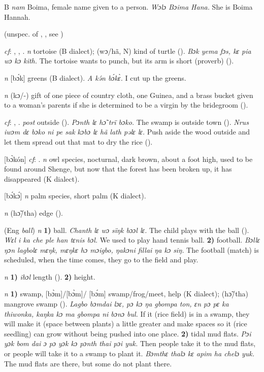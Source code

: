 \begin{letter}{B}
 \textit{nam} Boima, female name given to a person. \textit{Wɔlɔ Bɔima Hana.} She is Boima Hannah.

 (unspec. of , , see ) 

 \textit{cf}: , , . \textit{n} tortoise (B dialect); (wɔ/hã, N) kind of turtle (\citealt{Pichl1967}). \textit{Bɔk yema fɔs, kɛ pia wɔ kɔ kith.} The tortoise wants to punch, but its arm is short (proverb) (\citealt{TISLL1979}).

 \textit{n} [bɔ́k] greens (B dialect). \textit{A kə́n bɔ́kɛ̀.} I cut up the greens.

 \textit{n} (kɔ/-) gift of one piece of country cloth, one Guinea, and a brass bucket given to a woman's parents if she is determined to be a virgin by the bridegroom (\citealt{Pichl1967}). 

 \textit{cf}: , . \textit{post} outside (\citealt{Pichl1967}). \textit{Pɔnth lɛ hɔ̃ trï bɔko.} The swamp is outside town (\citealt{Pichl1967}). \textit{Nrus iwɔm dɛ bɔko ni pe sak kɔbɔ lɛ hã lath pəlɛ lɛ.} Push aside the wood outside and let them spread out that mat to dry the rice (\citealt{Pichl1967}). 

 [bɔ̀kón] \textit{cf}: . \textit{n} owl species, nocturnal, dark brown, about a foot high, used to be found around Shenge, but now that the forest has been broken up, it has disappeared (K dialect). 

 [bɔ́kɔ́] \textit{n} palm species, short palm (K dialect). 

 \textit{n} (hɔ̃/tha) edge (\citealt{Pichl1967}).

 (Eng \textit{ball}) \textit{n} \textbf{1)} ball. \textit{Chanth lɛ wɔ sïŋk bɔɔl lɛ.} The child plays with the ball (\citealt{Pichl1967}). \textit{Wɛl i ka che ple han tɛnis bɔl.} We used to play hand tennis ball. \textbf{2)} football. \textit{Bɔllɛ ŋɔn lagbolɛ mɛŋk, mɛŋkɛ hɔ mɔigbo, ŋakɔni fillai ŋa kɔ siŋ.} The football (match) is scheduled, when the time comes, they go to the field and play.

 \textit{n} \textbf{1)} \textit{ibɔl} length (\citealt{Sumner1921}). \textbf{2)} height.

 \textit{n} \textbf{1)} swamp, [bɔ̀m]/[bɔ̀m]/ [bɔ́m] swamp/frog/meet, help (K dialect); (hɔ̃/tha) mangrove swamp (\citealt{Pichl1967}). \textit{Lagbo bɔmdai lɔɛ, pɔ kɔ ŋa gbompa ton, ɛn pɔ pɛ ka thiwonka, kaŋka kɔ ma gbompa ni bɔnɔ bul.} If it (rice field) is in a swamp, they will make it (space between plants) a little greater and make spaces so it (rice seedling) can grow without being pushed into one place. \textbf{2)} tidal mud flats. \textit{Pɔi yɔk bom dai ɔ pɔ yɔk kɔ pɔnth thai pɔi yuk.} Then people take it to the mud flats, or people will take it to a swamp to plant it. \textit{Bɔmthɛ thalɔ kɛ apim ha chelɔ yuk.} The mud flats are there, but some do not plant there.


\end{letter}
